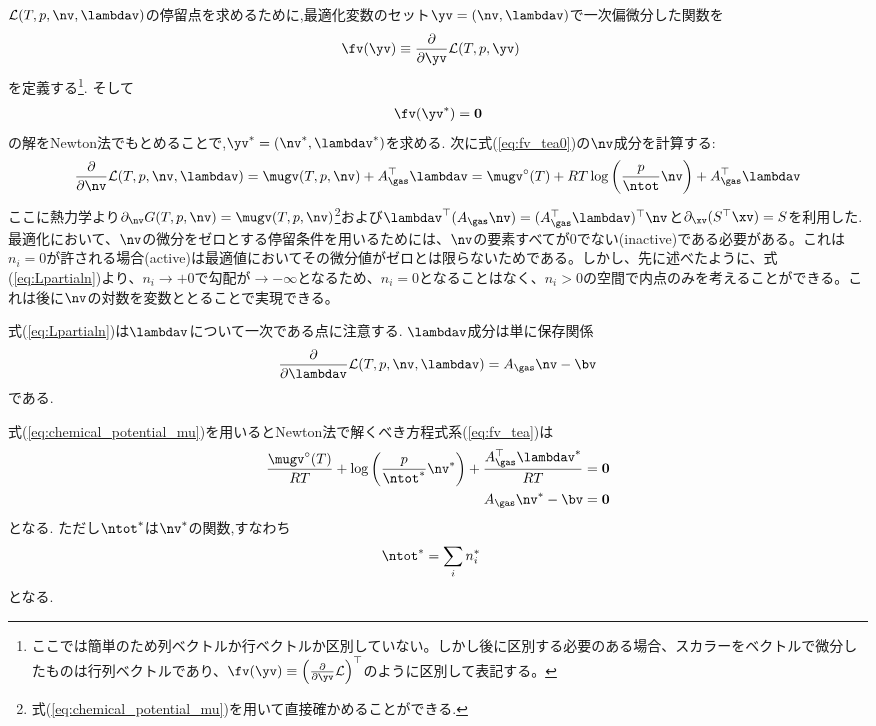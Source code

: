 $\mathcal{L}(T, p, \nv, \lambdav)$の停留点を求めるために,最適化変数のセット$\yv = (\nv, \lambdav)$で一次偏微分した関数を
\begin{align}
\label{eq:fv_tea0}
    \fv(\yv) &\equiv \frac{\partial  }{\partial \yv} \mathcal{L}(T, p, \yv) 
\end{align}
を定義する\footnote{ここでは簡単のため列ベクトルか行ベクトルか区別していない。しかし後に区別する必要のある場合、スカラーをベクトルで微分したものは行列ベクトルであり、$\fv(\yv) \equiv \left(\frac{\partial  }{\partial \yv} \mathcal{L} \right)^\top$のように区別して表記する。}. そして
\begin{align}
    \label{eq:fv_tea}
    \fv(\yv^\ast) = \boldsymbol{0}
\end{align}
の解をNewton法でもとめることで,$\yv^\ast = (\nv^\ast, \lambdav^\ast)$を求める. 次に式(\ref{eq:fv_tea0})の$\nv$成分を計算する:
\begin{align}
\label{eq:Lpartialn}
    \frac{\partial}{\partial \nv}   \mathcal{L}(T, p, \nv, \lambdav) =  \mugv (T, p, \nv) + A_\gas^\top \lambdav  =   \mugv^\circ(T) + RT \log{\left(\frac{p}{\ntot} \nv\right)} + A_\gas^\top \lambdav  
\end{align}
ここに熱力学より$\partial_{\nv} G(T, p, \nv) =  \mugv (T, p, \nv)$\footnote{式(\ref{eq:chemical_potential_mu})を用いて直接確かめることができる. }および$\lambdav^\top (A_\gas \nv) = (A_\gas^\top \lambdav)^\top \nv$と$\partial_{\xv} (S^\top \xv) = S$を利用した. 最適化において、$\nv$の微分をゼロとする停留条件を用いるためには、$\nv$の要素すべてが0でない(inactive)である必要がある。これは$n_i = 0$が許される場合(active)は最適値においてその微分値がゼロとは限らないためである。しかし、先に述べたように、式(\ref{eq:Lpartialn})より、$n_i \to +0$で勾配が$\to -\infty$となるため、$n_i = 0$となることはなく、$n_i > 0$の空間で内点のみを考えることができる。これは後に$\nv$の対数を変数ととることで実現できる。

式(\ref{eq:Lpartialn})は$\lambdav$について一次である点に注意する. $\lambdav$成分は単に保存関係
\begin{align}
\label{eq:Lpartiall}
\frac{\partial}{\partial \lambdav}  \mathcal{L}(T, p, \nv, \lambdav) = A_\gas \nv - \bv  
\end{align}
である. 

式(\ref{eq:chemical_potential_mu})を用いるとNewton法で解くべき方程式系(\ref{eq:fv_tea})は
\begin{align}
\label{eq:Lpartialnx}
    \frac{\mugv^\circ(T)}{RT}+ \log{\left(\frac{p}{\ntot^\ast} \nv^\ast \right)} + \frac{A_\gas^\top \lambdav^\ast}{RT}   &= \boldsymbol{0} \\
    A_\gas \nv^\ast - \bv &= \boldsymbol{0}
\end{align}
となる. ただし$\ntot^\ast$は$\nv^\ast$の関数,すなわち
\begin{align}
\ntot^\ast &= \sum_i n_i^\ast
\end{align}
となる. 


